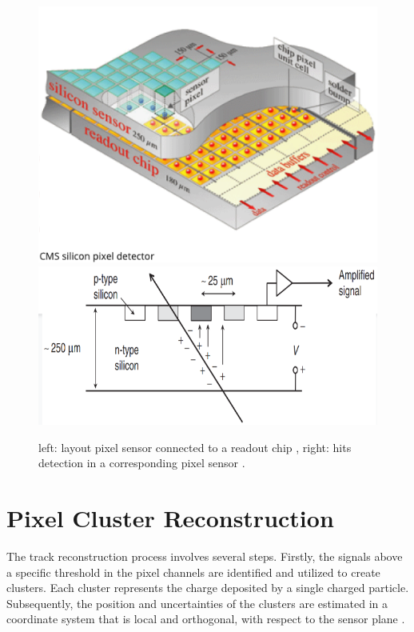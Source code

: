 \begin{center}
  \begin{figure}[h]
    \centering
    \includegraphics[scale=.3]{Chapter2/PixelSensor.png} \includegraphics[scale=.3]{Chapter2/hit.png}
    \caption[Schematic view of a pixel sensor and its connection to the readout channels]{ left: layout pixel sensor connected to a readout chip , right: hits detection in a corresponding  pixel sensor \citep{thomson_2013}. }
    \label{module and hit}
  \end{figure}
\end{center}

\section{Pixel Cluster Reconstruction}

The track reconstruction process involves several steps. Firstly, the signals above a specific threshold in the pixel channels are identified and utilized to create clusters. Each cluster represents the charge deposited by a single charged particle. Subsequently, the position and uncertainties of the clusters are estimated in a coordinate system that is local and orthogonal, with respect to the sensor plane \cite{Track_Reco_2014}.\\

